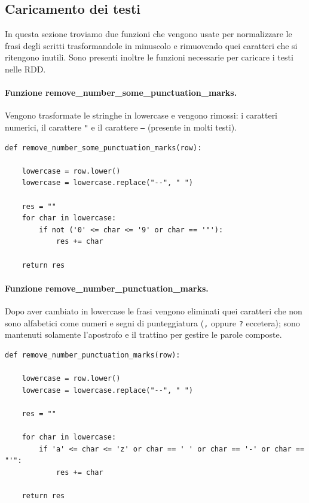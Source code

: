 \documentclass[titlepage]{article}
\begin{document}
\subsection{Caricamento dei testi}
In questa sezione troviamo due funzioni che vengono usate per normalizzare le frasi degli scritti trasformandole in minuscolo e  rimuovendo quei caratteri che si ritengono inutili. Sono presenti inoltre le funzioni necessarie per caricare i testi nelle RDD.

\paragraph{Funzione remove\_number\_some\_punctuation\_marks.}
Vengono trasformate le stringhe in lowercase e vengono rimossi: i caratteri numerici, il carattere \texttt{"} e il carattere \texttt{--} (presente in molti testi).
\begin{verbatim}
def remove_number_some_punctuation_marks(row):
    
    lowercase = row.lower()
    lowercase = lowercase.replace("--", " ")
    
    res = ""
    for char in lowercase:
        if not ('0' <= char <= '9' or char == '"'):
            res += char

    return res
\end{verbatim}

\paragraph{Funzione remove\_number\_punctuation\_marks.}
Dopo aver cambiato in lowercase le frasi vengono eliminati quei caratteri che non sono alfabetici come numeri e segni di punteggiatura (\texttt{,} oppure \texttt{?} eccetera); sono mantenuti solamente l'apostrofo e il trattino per gestire le parole composte.
\begin{verbatim}
def remove_number_punctuation_marks(row):
    
    lowercase = row.lower()
    lowercase = lowercase.replace("--", " ")
    
    res = ""
    
    for char in lowercase:
        if 'a' <= char <= 'z' or char == ' ' or char == '-' or char == "'":
            res += char

    return res
\end{verbatim}
\end{document}
